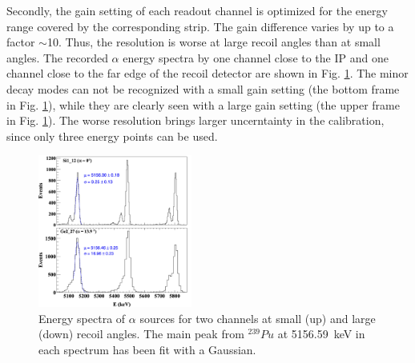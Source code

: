 \documentclass[number,5p]{elsarticle}
\begin{document}
Secondly, the gain setting of each readout channel is optimized for the energy range covered by the corresponding strip.
The gain difference varies by up to a factor $\mathtt{\sim}$10.
Thus, the resolution is worse at large recoil angles than at small angles.
The recorded $\alpha$ energy spectra by one channel close to the IP and one
channel close to the far edge of the recoil detector are shown in Fig. \ref{fig:alpha_spectrum}.
The minor decay modes can not be recognized with a small gain setting (the bottom frame
in Fig. \ref{fig:alpha_spectrum}), while they are clearly seen with a large gain
setting (the upper frame in Fig. \ref{fig:alpha_spectrum}).
The worse resolution brings larger uncerntainty in the calibration, since only three energy points can be used.
\begin{figure}[ht!]
  \centering
  \includegraphics[width=0.45\textwidth]{./alpha_comparison_corrected_fit_separate.png}
  \caption{Energy spectra of \(\alpha\) sources for two channels at small (up)
    and large (down) recoil angles. The main peak from $^{239}Pu$ at
    \SI{5156.59}{\keV} in each spectrum has been fit with a Gaussian.}
  \label{fig:alpha_spectrum}
\end{figure}
\end{document}
